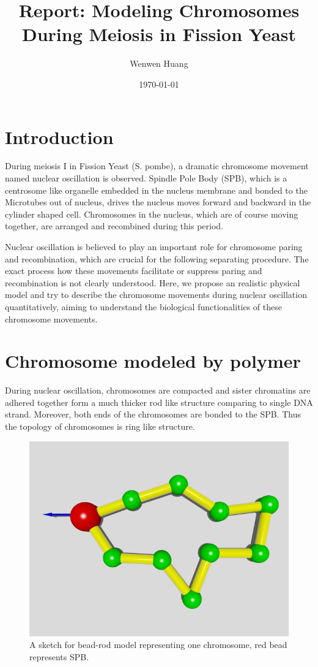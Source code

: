 \documentclass[12pt,a4paper]{article}
\begin{document}
\title{Report: Modeling Chromosomes During Meiosis in Fission Yeast}
\author{Wenwen Huang}
\date{\today}

\maketitle

\section{Introduction}
\label{sec:introduction}

During meiosis I in Fission Yeast (S. pombe), a dramatic chromosome movement
named nuclear oscillation is observed. Spindle Pole Body (SPB), which is a
centrosome like organelle embedded in the nucleus membrane and bonded to the
Microtubes out of nucleus, drives the nucleus moves forward and backward in the
cylinder shaped cell. Chromosomes in the nucleus, which are of course moving
together, are arranged and recombined during this period. 

Nuclear oscillation is believed to play an important role for chromosome
paring and recombination, which are crucial for the following separating
procedure. The exact process how these movements facilitate or suppress
paring and recombination is not clearly understood. Here, we propose an
realistic physical model and try to describe the chromosome movements during
nuclear oscillation quantitatively, aiming to understand the biological
functionalities of these chromosome movements.


\section{Chromosome modeled by polymer}
\label{sec:chromosome}

During nuclear oscillation, chromosomes are compacted and sister chromatins are
adhered together form a much thicker rod like structure comparing to single DNA
strand. Moreover, both ends of the chromosomes are bonded to the SPB. Thus the
topology of chromosomes is ring like structure. 
\begin{figure}[htpb]
	\centering
	\includegraphics[width=0.8\linewidth]{figs/Ring0.png}
	\caption{A sketch for bead-rod model representing one chromosome, red
		bead represents SPB.}
	\label{fig:Ring0}
\end{figure}
\end{document}
